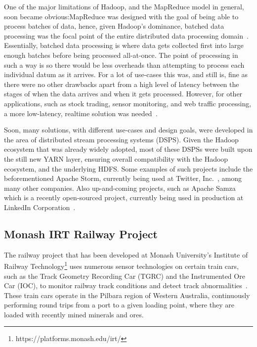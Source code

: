 One of the major limitations of Hadoop, and the MapReduce model in general, soon became obvious:\@ MapReduce was designed
with the goal of being able to process batches of data, hence, given Hadoop's dominance, batched data processing was the
focal point of the entire distributed data processing domain~\cite{kamburugamuve_survey_2014}. Essentially, batched data
processing is where data gets collected first into large enough batches before being processed all-at-once. The point of
processing in such a way is so there would be less overheads than attempting to process each individual datum as it
arrives. For a lot of use-cases this was, and still is, fine as there were no other drawbacks apart from a high level of
latency between the stages of when the data arrives and when it gets processed. However, for other applications, such as
stock trading, sensor monitoring, and web traffic processing, a more low-latency, realtime solution was
needed~\cite{kamburugamuve_survey_2014}.

Soon, many solutions, with different use-cases and design goals, were developed in the area of distributed stream
processing systems (DSPS). Given the Hadoop ecosystem that was already widely adopted, most of these DSPSs were built
upon the still new YARN layer, ensuring overall compatibility with the Hadoop ecosystem, and the underlying HDFS. Some
examples of such projects include the beforementioned Apache Storm, currently being used at Twitter,
Inc.~\cite{toshniwal_stormtwitter_2014}, among many other companies. Also up-and-coming projects, such as Apache Samza
which is a recently open-sourced project, currently being used in production at LinkedIn Corporation~\cite{web:Samza}.


\subsection{Monash IRT Railway Project} %
\label{sub:monash_irt_railway_project}

The railway project that has been developed at Monash University's Institute of Railway Technology\footnote{https://platforms.monash.edu/irt/}
uses numerous sensor
technologies on certain train cars, such as the Track Geometry Recording Car (TGRC) and the Instrumented Ore Car (IOC),
to monitor railway track conditions and detect track abnormalities~\cite{darby2003development,darby2005track}.
These train cars operate in the Pilbara region of Western Australia, continuously performing round trips from a port
to a given loading point, where they are loaded with recently mined minerals and ores.

